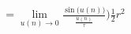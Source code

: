 \documentclass[preview]{standalone}
\begin{document}
\begin{align*}
= \lim_{u(n) \to 0} \frac {\sin \big(u(n)\big)} {\frac {u(n)}{\tau} } \big) \frac {1} {2} r^2
\end{align*}
\end{document}
